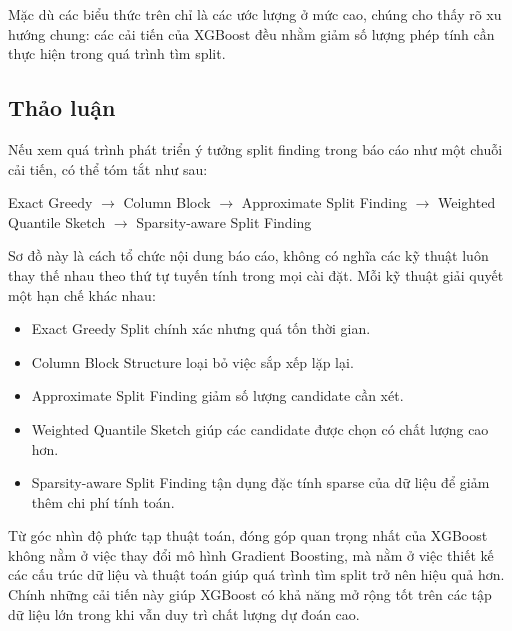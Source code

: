 Mặc dù các biểu thức trên chỉ là các ước lượng ở mức cao, chúng cho thấy rõ xu hướng chung: các cải tiến của XGBoost đều nhằm giảm số lượng phép tính cần thực hiện trong quá trình tìm split.

\subsection{Thảo luận}

Nếu xem quá trình phát triển ý tưởng split finding trong báo cáo như một chuỗi cải tiến, có thể tóm tắt như sau:

\begin{center}
Exact Greedy
$\rightarrow$
Column Block
$\rightarrow$
Approximate Split Finding
$\rightarrow$
Weighted Quantile Sketch
$\rightarrow$
Sparsity-aware Split Finding
\end{center}

Sơ đồ này là cách tổ chức nội dung báo cáo, không có nghĩa các kỹ thuật luôn thay thế nhau theo thứ tự tuyến tính trong mọi cài đặt. Mỗi kỹ thuật giải quyết một hạn chế khác nhau:

\begin{itemize}
    \item Exact Greedy Split chính xác nhưng quá tốn thời gian.
    \item Column Block Structure loại bỏ việc sắp xếp lặp lại.
    \item Approximate Split Finding giảm số lượng candidate cần xét.
    \item Weighted Quantile Sketch giúp các candidate được chọn có chất lượng cao hơn.
    \item Sparsity-aware Split Finding tận dụng đặc tính sparse của dữ liệu để giảm thêm chi phí tính toán.
\end{itemize}

Từ góc nhìn độ phức tạp thuật toán, đóng góp quan trọng nhất của XGBoost không nằm ở việc thay đổi mô hình Gradient Boosting, mà nằm ở việc thiết kế các cấu trúc dữ liệu và thuật toán giúp quá trình tìm split trở nên hiệu quả hơn. Chính những cải tiến này giúp XGBoost có khả năng mở rộng tốt trên các tập dữ liệu lớn trong khi vẫn duy trì chất lượng dự đoán cao.
